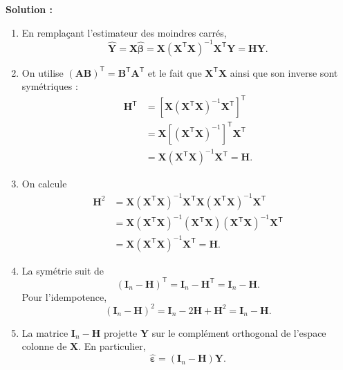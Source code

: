 \documentclass[letter, 11pt]{article}
\newcommand{\bY}{\mathbf{Y}}
\newcommand{\bX}{\mathbf{X}}
\newcommand{\bbeta}{\boldsymbol{\beta}}
\newcommand{\bepsilon}{\boldsymbol{\varepsilon}}
\newcommand{\bH}{\mathbf{H}}
\newcommand{\trans}{^{\mathsf T}}
\newcommand{\prof}[1]{\ifdefined\avecsolutions\par{\color{blue}\textbf{Solution :} #1}\par\fi}
\begin{document}
\begin{enumerate}[leftmargin=*, wide, label=\bf Exercice \arabic*:]
\prof{\begin{enumerate}[label=\alph*)]
  \item En remplaçant l'estimateur des moindres carrés,
        \[
        \widehat{\bY}=\bX\widehat{\bbeta}
        =\bX(\bX\trans\bX)^{-1}\bX\trans\bY
        =\bH\bY.
        \]

  \item On utilise $(\mathbf{A}\mathbf{B})\trans
        =\mathbf{B}\trans\mathbf{A}\trans$ et le fait que
        $\bX\trans\bX$ ainsi que son inverse sont symétriques :
        \begin{align*}
        \bH\trans
        &=\left[\bX(\bX\trans\bX)^{-1}\bX\trans\right]\trans\\
        &=\bX\left[(\bX\trans\bX)^{-1}\right]\trans\bX\trans\\
        &=\bX(\bX\trans\bX)^{-1}\bX\trans=\bH.
        \end{align*}

  \item On calcule
        \begin{align*}
        \bH^2
        &=\bX(\bX\trans\bX)^{-1}\bX\trans
          \bX(\bX\trans\bX)^{-1}\bX\trans\\
        &=\bX(\bX\trans\bX)^{-1}
          (\bX\trans\bX)(\bX\trans\bX)^{-1}\bX\trans\\
        &=\bX(\bX\trans\bX)^{-1}\bX\trans=\bH.
        \end{align*}

  \item La symétrie suit de
        \[
          (\mathbf{I}_n-\bH)\trans
          =\mathbf{I}_n-\bH\trans=\mathbf{I}_n-\bH.
        \]
        Pour l'idempotence,
        \[
          (\mathbf{I}_n-\bH)^2
          =\mathbf{I}_n-2\bH+\bH^2
          =\mathbf{I}_n-\bH.
        \]

  \item La matrice $\mathbf{I}_n-\bH$ projette $\bY$ sur le complément
        orthogonal de l'espace colonne de $\bX$. En particulier,
        \[
          \widehat{\bepsilon}=(\mathbf{I}_n-\bH)\bY.
        \]
\end{enumerate}
}


\end{enumerate}
\end{document}
